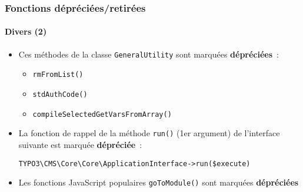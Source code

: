 %

\begin{frame}[fragile]
	\frametitle{Fonctions dépréciées/retirées}
	\framesubtitle{Divers (2)}


	\begin{itemize}
		\item Ces méthodes de la classe \texttt{GeneralUtility}
			sont marquées \textbf{dépréciées}~:
			\begin{itemize}
				\item \texttt{rmFromList()}
				\item \texttt{stdAuthCode()}
				\item \texttt{compileSelectedGetVarsFromArray()}
			\end{itemize}

		\item La fonction de rappel de la méthode \texttt{run()} (1er argument)
			de l'interface suivante est marquée \textbf{dépréciée}~:
\begin{lstlisting}
TYPO3\CMS\Core\Core\ApplicationInterface->run($execute)
\end{lstlisting}

		\item Les fonctions JavaScript populaires \texttt{goToModule()}
			sont marquées \textbf{dépréciées}

	\end{itemize}

\end{frame}

